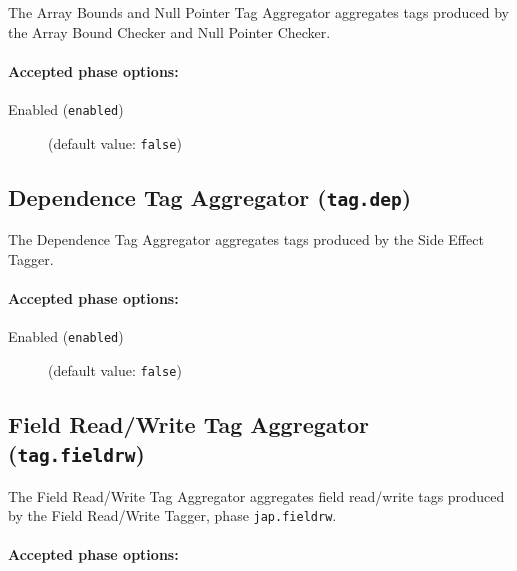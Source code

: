 \documentclass{article}
\begin{document}
The Array Bounds and Null Pointer Tag Aggregator aggregates
tags produced by the Array Bound Checker and Null Pointer Checker.


\paragraph{Accepted phase options:} 

\begin{description}

\item[Enabled ({\tt enabled})]
(default value: {\tt false})






\end{description}

\subsection{Dependence Tag Aggregator ({\tt tag.dep})}


\par

The Dependence Tag Aggregator aggregates
tags produced by the Side Effect Tagger.


\paragraph{Accepted phase options:} 

\begin{description}

\item[Enabled ({\tt enabled})]
(default value: {\tt false})






\end{description}

\subsection{Field Read/Write Tag Aggregator ({\tt tag.fieldrw})}

The Field Read/Write Tag Aggregator aggregates field read/write
tags produced by the Field Read/Write Tagger, phase
{\tt jap.fieldrw}.


\paragraph{Accepted phase options:} 
\end{document}
